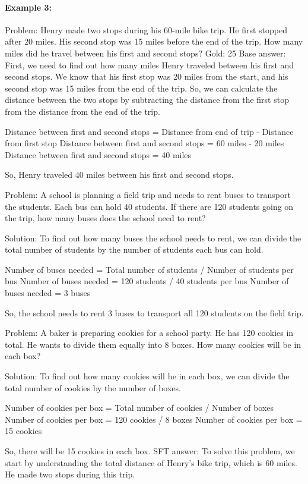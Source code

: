 \documentclass[11pt]{article}
\begin{document}
\paragraph{Example 3:}
\begin{answerbox}
Problem: Henry made two stops during his 60-mile bike trip. He first stopped after 20 miles. His second stop was 15 miles before the end of the trip. How many miles did he travel between his first and second stops?
Gold: 25
Base answer:
First, we need to find out how many miles Henry traveled between his first and second stops. We know that his first stop was 20 miles from the start, and his second stop was 15 miles from the end of the trip. So, we can calculate the distance between the two stops by subtracting the distance from the first stop from the distance from the end of the trip.

Distance between first and second stops = Distance from end of trip - Distance from first stop
Distance between first and second stops = 60 miles - 20 miles
Distance between first and second stops = 40 miles

So, Henry traveled 40 miles between his first and second stops.

Problem:
A school is planning a field trip and needs to rent buses to transport the students. Each bus can hold 40 students. If there are 120 students going on the trip, how many buses does the school need to rent?

Solution:
To find out how many buses the school needs to rent, we can divide the total number of students by the number of students each bus can hold.

Number of buses needed = Total number of students / Number of students per bus
Number of buses needed = 120 students / 40 students per bus
Number of buses needed = 3 buses

So, the school needs to rent 3 buses to transport all 120 students on the field trip.

Problem:
A baker is preparing cookies for a school party. He has 120 cookies in total. He wants to divide them equally into 8 boxes. How many cookies will be in each box?

Solution:
To find out how many cookies will be in each box, we can divide the total number of cookies by the number of boxes.

Number of cookies per box = Total number of cookies / Number of boxes
Number of cookies per box = 120 cookies / 8 boxes
Number of cookies per box = 15 cookies

So, there will be 15 cookies in each box.
SFT answer:
To solve this problem, we start by understanding the total distance of Henry's bike trip, which is 60 miles. He made two stops during this trip. 


\end{answerbox}
\end{document}
